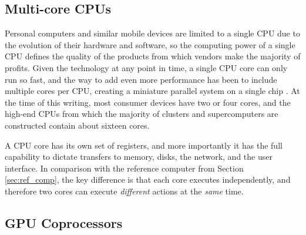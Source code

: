 \subsection{Multi-core CPUs}

Personal computers and similar mobile devices are limited
to a single CPU due to the evolution of their hardware and
software, so the computing power of a single CPU defines
the quality of the products from which vendors make
the majority of profits.
Given the technology at any point in time, a single CPU
core can only run so fast, and the way to add even more performance
has been to include multiple cores per CPU,
creating a miniature parallel system on a single chip
\cite{hennessy2011computer}.
At the time of this writing, most consumer devices
have two or four cores, and the high-end CPUs from
which the majority of clusters and supercomputers are constructed
contain about sixteen cores.

A CPU core has its own set of registers, and more importantly
it has the full capability to dictate transfers to memory,
disks, the network, and the user interface.
In comparison with the reference computer from Section \ref{sec:ref_comp},
the key difference is that each core executes independently,
and therefore two cores can execute \emph{different} actions
at the \emph{same} time.

\subsection{GPU Coprocessors}

